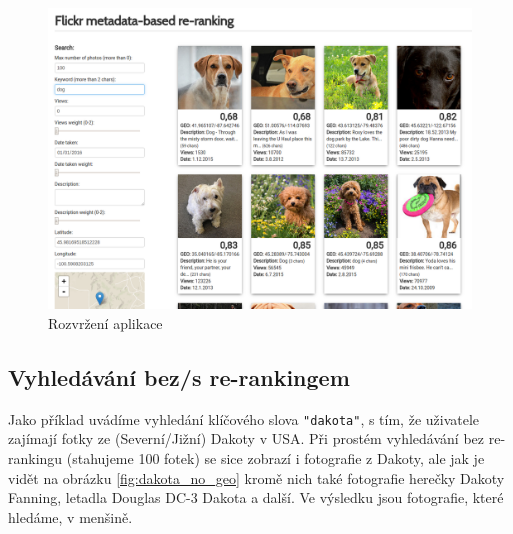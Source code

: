 \documentclass[12pt,oneside,a4paper]{article}
\begin{document}
\begin{figure}[H] \begin{center}
\includegraphics[width=13cm]{pics/layout.png} \caption{Rozvržení aplikace}
\label{fig:layout}
\end{center} \end{figure}

\subsection{Vyhledávání bez/s re-rankingem}
Jako příklad uvádíme vyhledání klíčového slova \texttt{"dakota"}, s tím, že uživatele zajímají fotky ze (Severní/Jižní) Dakoty v USA. Při prostém vyhledávání bez re-rankingu (stahujeme 100 fotek) se sice zobrazí i fotografie z Dakoty, ale jak je vidět na obrázku \ref{fig:dakota_no_geo} kromě nich také fotografie herečky Dakoty Fanning, letadla Douglas DC-3 Dakota a další. Ve výsledku jsou fotografie, které hledáme, v menšině.
\end{document}
